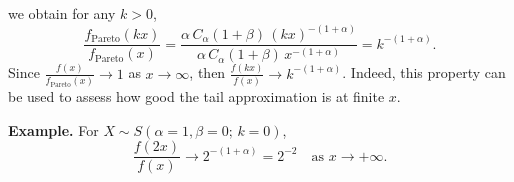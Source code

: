 \documentclass{article}
\theoremstyle{definition}
\begin{document}
\iffalse
we obtain for any $k > 0$, 
\begin{equation*}
\frac{f_{\mathrm{Pareto}}(k x)}{f_{\mathrm{Pareto}}(x)}
= \frac{\alpha\,C_\alpha(1+\beta)\,(k x)^{-(1+\alpha)}}
        {\alpha\,C_\alpha(1+\beta)\,x^{-(1+\alpha)}}
= k^{-(1+\alpha)}.
\end{equation*}
Since \(\frac{f(x)}{f_{\mathrm{Pareto}}(x)} \to 1\) as \(x \to \infty\), then \(\frac{f(kx)}{f(x)} \longrightarrow
k^{-(1+\alpha)}\).
Indeed, this property can be used to assess how good the tail approximation is at finite \(x\).

\noindent\textbf{Example.}
For \(X\sim S(\alpha=1,\beta=0;\,k=0)\),
\[
\frac{f(2x)}{f(x)} \rightarrow  2^{-(1+\alpha)} = 2^{-2} \quad \text{as }x\to+\infty.
\]
\end{document}
